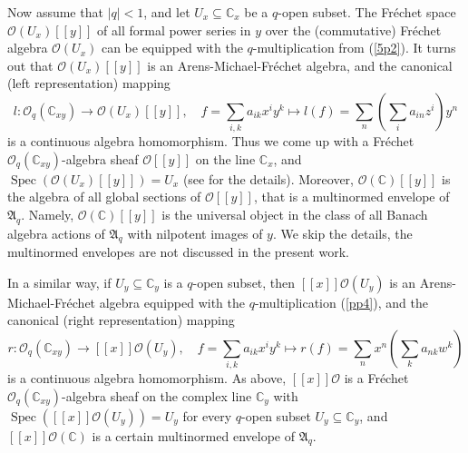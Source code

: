 \documentclass[12pt,reqno]{amsart}%
\theoremstyle{plain}
\numberwithin{theorem}{section} \numberwithin{equation}{section}
\numberwithin{lemma}{section}
\numberwithin{remark}{section}
\numberwithin{example}{section}
\numberwithin{proposition}{section}
\numberwithin{definition}{section}
\numberwithin{corollary}{section}
\begin{document}
Now assume that $\left\vert q\right\vert <1$, and let $U_{x}\subseteq
\mathbb{C}_{x}$ be a $q$-open subset. The Fr\'{e}chet space $\mathcal{O}%
\left(  U_{x}\right)  \left[  \left[  y\right]  \right]  $ of all formal power
series in $y$ over the (commutative) Fr\'{e}chet algebra $\mathcal{O}\left(
U_{x}\right)  $ can be equipped with the $q$-multiplication from (\ref{5p2}).
It turns out that $\mathcal{O}\left(  U_{x}\right)  \left[  \left[  y\right]
\right]  $ is an Arens-Michael-Fr\'{e}chet algebra, and the canonical (left
representation) mapping
\[
l:\mathcal{O}_{q}\left(  \mathbb{C}_{xy}\right)  \rightarrow\mathcal{O}\left(
U_{x}\right)  \left[  \left[  y\right]  \right]  ,\quad f=\sum_{i,k}%
a_{ik}x^{i}y^{k}\mapsto l\left(  f\right)  =\sum_{n}\left(  \sum_{i}%
a_{in}z^{i}\right)  y^{n}%
\]
is a continuous algebra homomorphism. Thus we come up with a Fr\'{e}chet
$\mathcal{O}_{q}\left(  \mathbb{C}_{xy}\right)  $-algebra sheaf $\mathcal{O}%
\left[  \left[  y\right]  \right]  $ on the line $\mathbb{C}_{x}$, and
$\operatorname{Spec}\left(  \mathcal{O}\left(  U_{x}\right)  \left[  \left[
y\right]  \right]  \right)  =U_{x}$ (see \cite{Dosi25} for the details).
Moreover, $\mathcal{O}\left(  \mathbb{C}\right)  \left[  \left[  y\right]
\right]  $ is the algebra of all global sections of $\mathcal{O}\left[
\left[  y\right]  \right]  $, that is a multinormed envelope of $\mathfrak{A}%
_{q}$. Namely, $\mathcal{O}\left(  \mathbb{C}\right)  \left[  \left[
y\right]  \right]  $ is the universal object in the class of all Banach
algebra actions of $\mathfrak{A}_{q}$ with nilpotent images of $y$. We skip
the details, the multinormed envelopes are not discussed in the present work.

In a similar way, if $U_{y}\subseteq\mathbb{C}_{y}$ is a $q$-open subset, then
$\left[  \left[  x\right]  \right]  \mathcal{O}\left(  U_{y}\right)  $ is an
Arens-Michael-Fr\'{e}chet algebra equipped with the $q$-multiplication
(\ref{pp4}), and the canonical (right representation) mapping
\[
r:\mathcal{O}_{q}\left(  \mathbb{C}_{xy}\right)  \rightarrow\left[  \left[
x\right]  \right]  \mathcal{O}\left(  U_{y}\right)  ,\quad f=\sum_{i,k}%
a_{ik}x^{i}y^{k}\mapsto r\left(  f\right)  =\sum_{n}x^{n}\left(  \sum
_{k}a_{nk}w^{k}\right)
\]
is a continuous algebra homomorphism. As above, $\left[  \left[  x\right]
\right]  \mathcal{O}$ is a Fr\'{e}chet $\mathcal{O}_{q}\left(  \mathbb{C}%
_{xy}\right)  $-algebra sheaf on the complex line $\mathbb{C}_{y}$ with
$\operatorname{Spec}\left(  \left[  \left[  x\right]  \right]  \mathcal{O}%
\left(  U_{y}\right)  \right)  =U_{y}$ for every $q$-open subset
$U_{y}\subseteq\mathbb{C}_{y}$, and $\left[  \left[  x\right]  \right]
\mathcal{O}\left(  \mathbb{C}\right)  $ is a certain multinormed envelope of
$\mathfrak{A}_{q}$.
\end{document}

